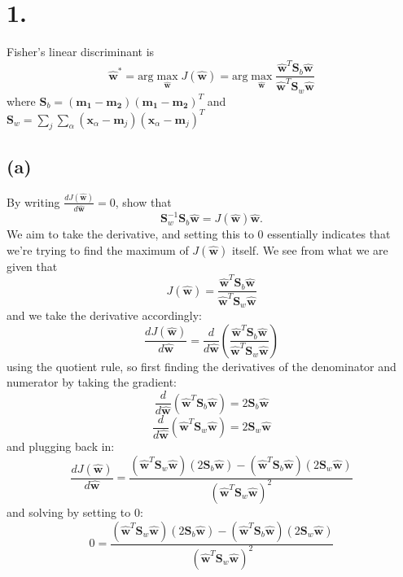 \documentclass{article}
\begin{document}
\thispagestyle{firstpageheader}
{\Large 

\section*{1.}
Fisher's linear discriminant is 
\[
  \hat{\mathbf{w}}^* = \text{arg} \max_{\hat{\mathbf{w}}} J(\hat{\mathbf{w}}) = \text{arg} \max_{\hat{\mathbf{w}}} \frac{\hat{\mathbf{w}}^T \mathbf{S}_b \hat{\mathbf{w}}}{\hat{\mathbf{w}}^T \mathbf{S}_w \hat{\mathbf{w}}}
\]
where \(\mathbf{S}_b = (\mathbf{m_1} - \mathbf{m_2}) (\mathbf{m_1} - \mathbf{m_2})^T\) and \(\mathbf{S}_w = \sum_j \sum_\alpha (\mathbf{x}_\alpha - \mathbf{m}_j) (\mathbf{x}_\alpha - \mathbf{m}_j)^T\)

\subsection*{(a)} 
By writing \(\frac{d J(\hat{\mathbf{w}})}{d \hat{\mathbf{w}}} = 0\), show that 
\[
  \mathbf{S}_w^{-1} \mathbf{S}_b \hat{\mathbf{w}} = J(\hat{\mathbf{w}}) \hat{\mathbf{w}}.
\]
We aim to take the derivative, and setting this to 0 essentially indicates that we're trying to find the maximum of \(J(\hat{\mathbf{w}})\) itself. We see from what we are given that
\[
  J(\hat{\mathbf{w}}) = \frac{\hat{\mathbf{w}}^T \mathbf{S}_b \hat{\mathbf{w}}}{\hat{\mathbf{w}}^T \mathbf{S}_w \hat{\mathbf{w}}}
\]
and we take the derivative accordingly:
\[
  \frac{dJ(\hat{\mathbf{w}})}{d\hat{\mathbf{w}}} = \frac{d}{d \hat{\mathbf{w}}} (\frac{\hat{\mathbf{w}}^T \mathbf{S}_b \hat{\mathbf{w}}}{\hat{\mathbf{w}}^T \mathbf{S}_w \hat{\mathbf{w}}})
\]
using the quotient rule, so first finding the derivatives of the denominator and numerator by taking the gradient:
\[
  \frac{d}{d \hat{\mathbf{w}}} (\hat{\mathbf{w}}^T \mathbf{S}_b \hat{\mathbf{w}}) = 2\mathbf{S}_b \hat{\mathbf{w}}
\]
\[
  \frac{d}{d \hat{\mathbf{w}}} (\hat{\mathbf{w}}^T \mathbf{S}_w \hat{\mathbf{w}}) = 2\mathbf{S}_w \hat{\mathbf{w}}
\]
and plugging back in:
\[
  \frac{dJ(\hat{\mathbf{w}})}{d\hat{\mathbf{w}}} = \frac{(\hat{\mathbf{w}}^T \mathbf{S}_w \hat{\mathbf{w}})(2\mathbf{S}_b \hat{\mathbf{w}}) - (\hat{\mathbf{w}}^T \mathbf{S}_b \hat{\mathbf{w}})(2\mathbf{S}_w \hat{\mathbf{w}})}{(\hat{\mathbf{w}}^T \mathbf{S}_w \hat{\mathbf{w}})^2}
\]
and solving by setting to 0:
\[
  0 = \frac{(\hat{\mathbf{w}}^T \mathbf{S}_w \hat{\mathbf{w}})(2\mathbf{S}_b \hat{\mathbf{w}}) - (\hat{\mathbf{w}}^T \mathbf{S}_b \hat{\mathbf{w}})(2\mathbf{S}_w \hat{\mathbf{w}})}{(\hat{\mathbf{w}}^T \mathbf{S}_w \hat{\mathbf{w}})^2}
\]
}
\end{document}
